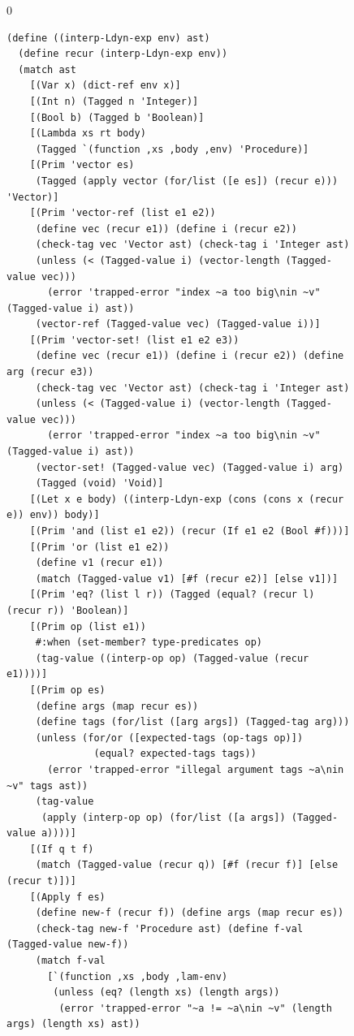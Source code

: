 \documentclass[7x10]{TimesAPriori_MIT}%
\def\racketEd{0}
\def\edition{1}
\numberwithin{theorem}{chapter}
\numberwithin{definition}{chapter}
\numberwithin{equation}{chapter}
\begin{document}
\begin{figure}[tbp]
  \begin{tcolorbox}[colback=white]
    {\if\edition\racketEd
\begin{lstlisting}[basicstyle=\ttfamily\footnotesize]
(define ((interp-Ldyn-exp env) ast)
  (define recur (interp-Ldyn-exp env))
  (match ast
    [(Var x) (dict-ref env x)]
    [(Int n) (Tagged n 'Integer)]
    [(Bool b) (Tagged b 'Boolean)]
    [(Lambda xs rt body)
     (Tagged `(function ,xs ,body ,env) 'Procedure)]
    [(Prim 'vector es)
     (Tagged (apply vector (for/list ([e es]) (recur e))) 'Vector)]
    [(Prim 'vector-ref (list e1 e2))
     (define vec (recur e1)) (define i (recur e2))
     (check-tag vec 'Vector ast) (check-tag i 'Integer ast)
     (unless (< (Tagged-value i) (vector-length (Tagged-value vec)))
       (error 'trapped-error "index ~a too big\nin ~v" (Tagged-value i) ast))
     (vector-ref (Tagged-value vec) (Tagged-value i))]
    [(Prim 'vector-set! (list e1 e2 e3))
     (define vec (recur e1)) (define i (recur e2)) (define arg (recur e3))
     (check-tag vec 'Vector ast) (check-tag i 'Integer ast)
     (unless (< (Tagged-value i) (vector-length (Tagged-value vec)))
       (error 'trapped-error "index ~a too big\nin ~v" (Tagged-value i) ast))
     (vector-set! (Tagged-value vec) (Tagged-value i) arg)
     (Tagged (void) 'Void)]
    [(Let x e body) ((interp-Ldyn-exp (cons (cons x (recur e)) env)) body)]
    [(Prim 'and (list e1 e2)) (recur (If e1 e2 (Bool #f)))]
    [(Prim 'or (list e1 e2))
     (define v1 (recur e1))
     (match (Tagged-value v1) [#f (recur e2)] [else v1])]
    [(Prim 'eq? (list l r)) (Tagged (equal? (recur l) (recur r)) 'Boolean)]
    [(Prim op (list e1))
     #:when (set-member? type-predicates op)
     (tag-value ((interp-op op) (Tagged-value (recur e1))))]
    [(Prim op es)
     (define args (map recur es))
     (define tags (for/list ([arg args]) (Tagged-tag arg)))
     (unless (for/or ([expected-tags (op-tags op)])
               (equal? expected-tags tags))
       (error 'trapped-error "illegal argument tags ~a\nin ~v" tags ast))
     (tag-value
      (apply (interp-op op) (for/list ([a args]) (Tagged-value a))))]
    [(If q t f)
     (match (Tagged-value (recur q)) [#f (recur f)] [else (recur t)])]
    [(Apply f es)
     (define new-f (recur f)) (define args (map recur es))
     (check-tag new-f 'Procedure ast) (define f-val (Tagged-value new-f))
     (match f-val 
       [`(function ,xs ,body ,lam-env)
        (unless (eq? (length xs) (length args))
         (error 'trapped-error "~a != ~a\nin ~v" (length args) (length xs) ast))

\end{lstlisting}}
\end{tcolorbox}
\end{figure}
\end{document}
